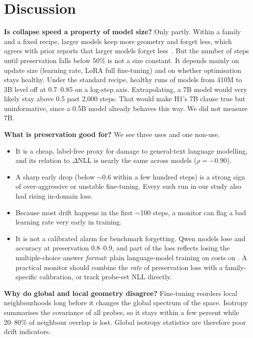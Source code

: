 \section{Discussion}
\label{sec:discussion}

{\bf Is collapse speed a property of model size?} Only partly. Within a family and a fixed recipe, larger models keep more geometry and forget less, which agrees with prior reports that larger models forget less~\citep{kalajdzievski2024scaling}. But the number of steps until preservation falls below 50\% is not a size constant. It depends mainly on update size (learning rate, LoRA \versus full fine-tuning) and on whether optimisation stays healthy. Under the standard recipe, healthy runs of models from 410M to 3B level off at 0.7--0.85 on a log-step axis. Extrapolating, a 7B model would very likely stay above 0.5 past 2,000 steps. That would make H1's 7B clause true but uninformative, since a 0.5B model already behaves this way. We did not measure 7B.

{\bf What is preservation good for?} We see three uses and one non-use.
\begin{itemize}[leftmargin=*,itemsep=0pt,topsep=0pt]
    \item It is a cheap, label-free proxy for damage to general-text language modelling, and its relation to $\Delta$NLL is nearly the same across models ($\rho=-0.90$).
    \item A sharp early drop (\eg below $\sim$0.6 within a few hundred steps) is a strong sign of over-aggressive or unstable fine-tuning. Every such run in our study also had rising in-domain loss.
    \item Because most drift happens in the first $\sim$100 steps, a monitor can flag a bad learning rate very early in training.
    \item It is not a calibrated alarm for benchmark forgetting. Qwen models lose \mmlu and \arce accuracy at preservation 0.8--0.9, and part of the \mmlu loss reflects losing the multiple-choice answer \emph{format}: plain language-model training on \wikitext costs \pp on \mmlu. A practical monitor should combine the \emph{rate} of preservation loss with a family-specific calibration, or track probe-set NLL directly.
\end{itemize}

{\bf Why do global and local geometry disagree?} Fine-tuning reorders local neighbourhoods long before it changes the global spectrum of the space. Isotropy summarises the covariance of all probes, so it stays within a few percent while 20--80\% of neighbour overlap is lost. Global isotropy statistics are therefore poor drift indicators.

